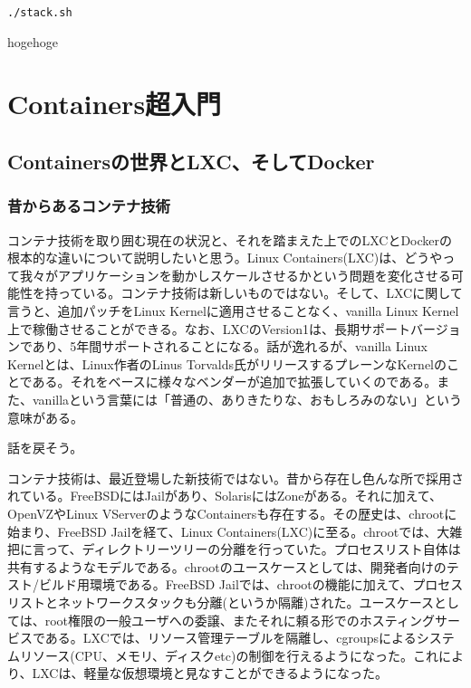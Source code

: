 \documentclass[9pt,b5paper,tombo]{jsbook}
\begin{document}
\begin{lstlisting}
./stack.sh
\end{lstlisting}

hogehoge

\chapter{Containers超入門}

\section{Containersの世界とLXC、そしてDocker}

\subsection{昔からあるコンテナ技術}
コンテナ技術を取り囲む現在の状況と、それを踏まえた上でのLXCとDockerの根本的な違いについて説明したいと思う。Linux Containers(LXC)は、どうやって我々がアプリケーションを動かしスケールさせるかという問題を変化させる可能性を持っている。コンテナ技術は新しいものではない。そして、LXCに関して言うと、追加パッチをLinux Kernelに適用させることなく、vanilla Linux Kernel上で稼働させることができる。なお、LXCのVersion1は、長期サポートバージョンであり、5年間サポートされることになる。話が逸れるが、vanilla Linux Kernelとは、Linux作者のLinus Torvalds氏がリリースするプレーンなKernelのことである。それをベースに様々なベンダーが追加で拡張していくのである。また、vanillaという言葉には「普通の、ありきたりな、おもしろみのない」という意味がある。

話を戻そう。

コンテナ技術は、最近登場した新技術ではない。昔から存在し色んな所で採用されている。FreeBSDにはJailがあり、SolarisにはZoneがある。それに加えて、OpenVZやLinux VServerのようなContainersも存在する。その歴史は、chrootに始まり、FreeBSD Jailを経て、Linux Containers(LXC)に至る。chrootでは、大雑把に言って、ディレクトリーツリーの分離を行っていた。プロセスリスト自体は共有するようなモデルである。chrootのユースケースとしては、開発者向けのテスト/ビルド用環境である。FreeBSD Jailでは、chrootの機能に加えて、プロセスリストとネットワークスタックも分離(というか隔離)された。ユースケースとしては、root権限の一般ユーザへの委譲、またそれに頼る形でのホスティングサービスである。LXCでは、リソース管理テーブルを隔離し、cgroupsによるシステムリソース(CPU、メモリ、ディスクetc)の制御を行えるようになった。これにより、LXCは、軽量な仮想環境と見なすことができるようになった。
\end{document}
